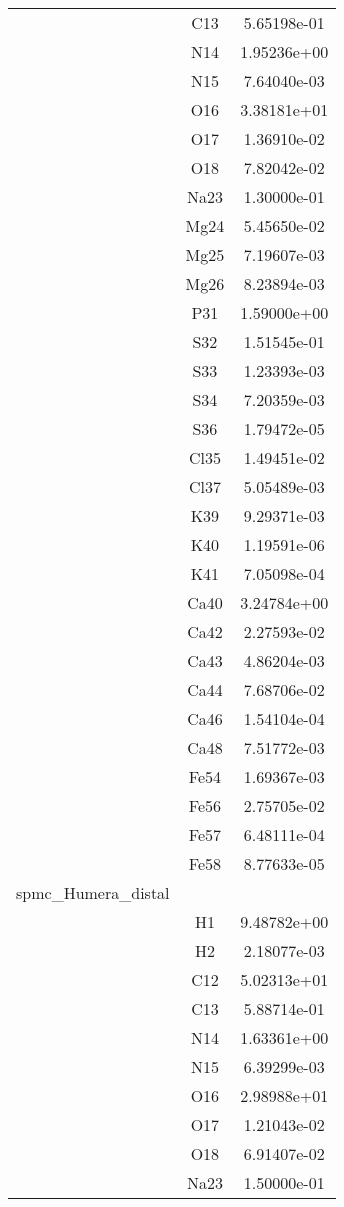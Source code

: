 \begin{centering}
\begin{longtable}{l c c}
& C13 & 5.65198e-01 \\ 
& N14 & 1.95236e+00 \\ 
& N15 & 7.64040e-03 \\ 
& O16 & 3.38181e+01 \\ 
& O17 & 1.36910e-02 \\ 
& O18 & 7.82042e-02 \\ 
& Na23 & 1.30000e-01 \\ 
& Mg24 & 5.45650e-02 \\ 
& Mg25 & 7.19607e-03 \\ 
& Mg26 & 8.23894e-03 \\ 
& P31 & 1.59000e+00 \\ 
& S32 & 1.51545e-01 \\ 
& S33 & 1.23393e-03 \\ 
& S34 & 7.20359e-03 \\ 
& S36 & 1.79472e-05 \\ 
& Cl35 & 1.49451e-02 \\ 
& Cl37 & 5.05489e-03 \\ 
& K39 & 9.29371e-03 \\ 
& K40 & 1.19591e-06 \\ 
& K41 & 7.05098e-04 \\ 
& Ca40 & 3.24784e+00 \\ 
& Ca42 & 2.27593e-02 \\ 
& Ca43 & 4.86204e-03 \\ 
& Ca44 & 7.68706e-02 \\ 
& Ca46 & 1.54104e-04 \\ 
& Ca48 & 7.51772e-03 \\ 
& Fe54 & 1.69367e-03 \\ 
& Fe56 & 2.75705e-02 \\ 
& Fe57 & 6.48111e-04 \\ 
& Fe58 & 8.77633e-05 \\ 
\hline
spmc\_Humera\_distal & & \\
\hline
& H1 & 9.48782e+00 \\ 
& H2 & 2.18077e-03 \\ 
& C12 & 5.02313e+01 \\ 
& C13 & 5.88714e-01 \\ 
& N14 & 1.63361e+00 \\ 
& N15 & 6.39299e-03 \\ 
& O16 & 2.98988e+01 \\ 
& O17 & 1.21043e-02 \\ 
& O18 & 6.91407e-02 \\ 
& Na23 & 1.50000e-01 \\ 

\end{longtable}
\end{centering}
